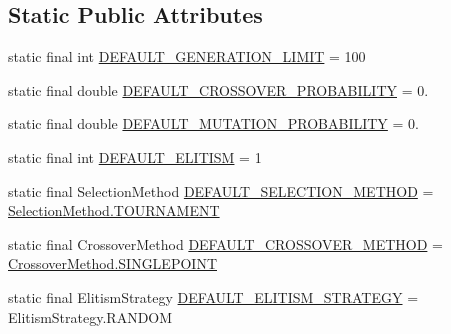 \subsection*{Static Public Attributes}
\begin{DoxyCompactItemize}
\item 
static final int \hyperlink{classjenes_1_1algorithms_1_1_simple_g_a_3_01_t_01extends_01_chromosome_01_4_ac4060f400a4a9d81185713c244699d40}{D\-E\-F\-A\-U\-L\-T\-\_\-\-G\-E\-N\-E\-R\-A\-T\-I\-O\-N\-\_\-\-L\-I\-M\-I\-T} = 100
\item 
static final double \hyperlink{classjenes_1_1algorithms_1_1_simple_g_a_3_01_t_01extends_01_chromosome_01_4_a6bb4783aa44abaae39375ae762412fa3}{D\-E\-F\-A\-U\-L\-T\-\_\-\-C\-R\-O\-S\-S\-O\-V\-E\-R\-\_\-\-P\-R\-O\-B\-A\-B\-I\-L\-I\-T\-Y} = 0.
\item 
static final double \hyperlink{classjenes_1_1algorithms_1_1_simple_g_a_3_01_t_01extends_01_chromosome_01_4_a6b93f23c518016295e31b02aa7ef1f8c}{D\-E\-F\-A\-U\-L\-T\-\_\-\-M\-U\-T\-A\-T\-I\-O\-N\-\_\-\-P\-R\-O\-B\-A\-B\-I\-L\-I\-T\-Y} = 0.
\item 
static final int \hyperlink{classjenes_1_1algorithms_1_1_simple_g_a_3_01_t_01extends_01_chromosome_01_4_a3b820957538efb558e8240e996d503cd}{D\-E\-F\-A\-U\-L\-T\-\_\-\-E\-L\-I\-T\-I\-S\-M} = 1
\item 
static final Selection\-Method \hyperlink{classjenes_1_1algorithms_1_1_simple_g_a_3_01_t_01extends_01_chromosome_01_4_a93d44174d00fdf0a8ebedfa3badcde66}{D\-E\-F\-A\-U\-L\-T\-\_\-\-S\-E\-L\-E\-C\-T\-I\-O\-N\-\_\-\-M\-E\-T\-H\-O\-D} = \hyperlink{enumjenes_1_1algorithms_1_1_simple_g_a_3_01_t_01extends_01_chromosome_01_4_1_1_selection_method_aa82c1a99611b7bd81e72f0f8429606cd}{Selection\-Method.\-T\-O\-U\-R\-N\-A\-M\-E\-N\-T}
\item 
static final Crossover\-Method \hyperlink{classjenes_1_1algorithms_1_1_simple_g_a_3_01_t_01extends_01_chromosome_01_4_a568bc71d97e1221ff4c7a4cc2b9a938d}{D\-E\-F\-A\-U\-L\-T\-\_\-\-C\-R\-O\-S\-S\-O\-V\-E\-R\-\_\-\-M\-E\-T\-H\-O\-D} = \hyperlink{enumjenes_1_1algorithms_1_1_simple_g_a_3_01_t_01extends_01_chromosome_01_4_1_1_crossover_method_a0dba044ab40298639e47034fda066ece}{Crossover\-Method.\-S\-I\-N\-G\-L\-E\-P\-O\-I\-N\-T}
\item 
static final Elitism\-Strategy \hyperlink{classjenes_1_1algorithms_1_1_simple_g_a_3_01_t_01extends_01_chromosome_01_4_ab95f26a5f33145a73eed2832becb962f}{D\-E\-F\-A\-U\-L\-T\-\_\-\-E\-L\-I\-T\-I\-S\-M\-\_\-\-S\-T\-R\-A\-T\-E\-G\-Y} = Elitism\-Strategy.\-R\-A\-N\-D\-O\-M
\end{DoxyCompactItemize}
